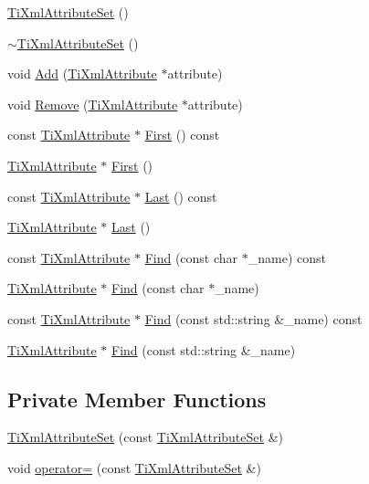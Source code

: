 \begin{DoxyCompactItemize}
\item 
\hyperlink{class_ti_xml_attribute_set_a253c33b657cc85a07f7f060b02146c35}{Ti\+Xml\+Attribute\+Set} ()
\item 
\hyperlink{class_ti_xml_attribute_set_add463905dff96142a29fe16a01ecf28f}{$\sim$\+Ti\+Xml\+Attribute\+Set} ()
\item 
void \hyperlink{class_ti_xml_attribute_set_a745e50ddaae3bee93e4589321e0b9c1a}{Add} (\hyperlink{class_ti_xml_attribute}{Ti\+Xml\+Attribute} $\ast$attribute)
\item 
void \hyperlink{class_ti_xml_attribute_set_a924a73d071f2573f9060f0be57879c57}{Remove} (\hyperlink{class_ti_xml_attribute}{Ti\+Xml\+Attribute} $\ast$attribute)
\item 
const \hyperlink{class_ti_xml_attribute}{Ti\+Xml\+Attribute} $\ast$ \hyperlink{class_ti_xml_attribute_set_a85dfd2b5bae45c94334dced146f5c11a}{First} () const
\item 
\hyperlink{class_ti_xml_attribute}{Ti\+Xml\+Attribute} $\ast$ \hyperlink{class_ti_xml_attribute_set_a99703bb08ca2aece2d7ef835de339ba0}{First} ()
\item 
const \hyperlink{class_ti_xml_attribute}{Ti\+Xml\+Attribute} $\ast$ \hyperlink{class_ti_xml_attribute_set_a3b0d49f3802effcf377f32d9a359302c}{Last} () const
\item 
\hyperlink{class_ti_xml_attribute}{Ti\+Xml\+Attribute} $\ast$ \hyperlink{class_ti_xml_attribute_set_ab4c4edfb2d74f6ea31aae096743bd6e0}{Last} ()
\item 
const \hyperlink{class_ti_xml_attribute}{Ti\+Xml\+Attribute} $\ast$ \hyperlink{class_ti_xml_attribute_set_a39e9f5ed5ebbf02e059dd39cfa6c5052}{Find} (const char $\ast$\+\_\+name) const
\item 
\hyperlink{class_ti_xml_attribute}{Ti\+Xml\+Attribute} $\ast$ \hyperlink{class_ti_xml_attribute_set_a2f210bed54c832adf1683c44c35727b9}{Find} (const char $\ast$\+\_\+name)
\item 
const \hyperlink{class_ti_xml_attribute}{Ti\+Xml\+Attribute} $\ast$ \hyperlink{class_ti_xml_attribute_set_a49280440d5168e23b531e64afd399e50}{Find} (const std\+::string \&\+\_\+name) const
\item 
\hyperlink{class_ti_xml_attribute}{Ti\+Xml\+Attribute} $\ast$ \hyperlink{class_ti_xml_attribute_set_ab154233f8ecffc0ee0c77a045fa9e69b}{Find} (const std\+::string \&\+\_\+name)
\end{DoxyCompactItemize}
\subsection*{Private Member Functions}
\begin{DoxyCompactItemize}
\item 
\hyperlink{class_ti_xml_attribute_set_acb244bc616c28b1c4b8e8417f28e5f9e}{Ti\+Xml\+Attribute\+Set} (const \hyperlink{class_ti_xml_attribute_set}{Ti\+Xml\+Attribute\+Set} \&)
\item 
void \hyperlink{class_ti_xml_attribute_set_a977f5b50c94e7b6beb01875298fa14a2}{operator=} (const \hyperlink{class_ti_xml_attribute_set}{Ti\+Xml\+Attribute\+Set} \&)
\end{DoxyCompactItemize}
